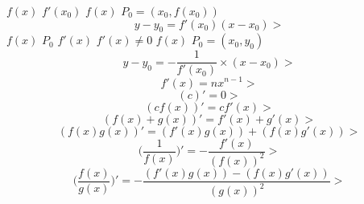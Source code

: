 \documentclass{article}
\begin{document}
$f(x)$
$f'(x_0)$
$f(x)$
$P_0=(x_0, f(x_0))$
$$
y-y_0=f'(x_0)(x-x_0)
>$$
$f(x)$
$P_0$
$f'(x)$
$f'(x)\not=0$
$f(x)$
$P_0=(x_0,y_0)$
$$
y-y_0=-\frac{1}{f'(x_0)}\times(x-x_0)
>$$
$$
f'(x)=nx^{n-1}
>$$
$$
(c)'=0
>$$
$$
(cf(x))'=cf'(x)
>$$
$$
(f(x)+g(x))'=f'(x)+g'(x)
>$$
$$
(f(x)g(x))'=(f'(x)g(x))+(f(x)g'(x))
>$$
$$
\Bigg(\frac{1}{f(x)}\Bigg)'=-\frac{f'(x)}{(f(x))^2}
>$$
$$
\Bigg(\frac{f(x)}{g(x)}\Bigg)'=-\frac{(f'(x)g(x))-(f(x)g'(x))}{(g(x))^2}
>$$
\end{document}
